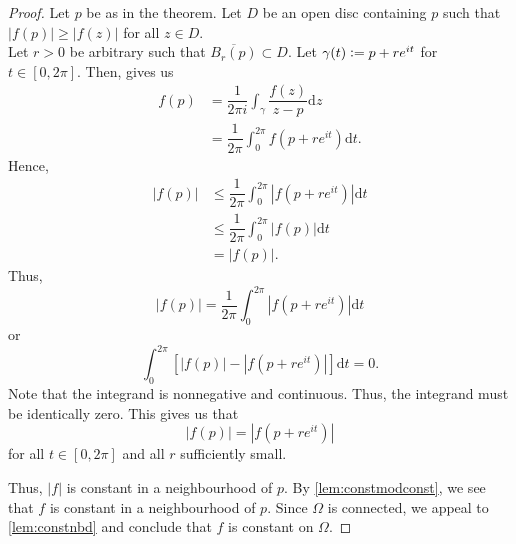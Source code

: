 \maxmod*\label{thm:maxmod2}
\begin{flushright}\hyperref[thm:maxmod]{\upsym}\end{flushright}
\begin{proof}
	Let $p$ be as in the theorem. Let $D$ be an open disc containing $p$ such that $\left|f(p)\right| \ge \left|f(z)\right|$ for all $z \in D.$\\
	Let $r > 0$ be arbitrary such that $\overline{B_r(p)} \subset D.$ Let $\gamma(t) \vcentcolon= p + re^{it}$ for $t \in [0, 2\pi].$ Then,  gives us
	\begin{align*} 
		f(p) &= \dfrac{1}{2\pi i}\int_{\gamma}^{} \dfrac{f(z)}{z - p} \mathrm{d}z\\
		&= \dfrac{1}{2\pi}\int_{0}^{2\pi} f(p + re^{it}) \mathrm{d}t.
	\end{align*}
	Hence,
	\begin{align*} 
		\left|f(p)\right| &\le \dfrac{1}{2\pi}\int_{0}^{2\pi} \left|{f(p + re^{it})}\right| \mathrm{d}t\\
		&\le \dfrac{1}{2\pi}\int_{0}^{2\pi} \left|{f(p)}\right| \mathrm{d}t\\
		&= \left|f(p)\right|.
	\end{align*}
	Thus,
	\begin{equation*} 
		\left|f(p)\right| = \dfrac{1}{2\pi}\int_{0}^{2\pi} \left|{f(p + re^{it})}\right| \mathrm{d}t
	\end{equation*}
	or
	\begin{equation*} 
		\int_{0}^{2\pi} \left[\left|f(p)\right| - \left|{f(p + re^{it})}\right|\right] \mathrm{d}t = 0.
	\end{equation*}
	Note that the integrand is nonnegative and continuous. Thus, the integrand must be identically zero. This gives us that
	\begin{equation*} 
		\left|f(p)\right| = \left|f(p + re^{it})\right|
	\end{equation*}
	for all $t \in [0, 2\pi]$ and all $r$ sufficiently small.

	Thus, $|f|$ is constant in a neighbourhood of $p.$ By \cref{lem:constmodconst}, we see that $f$ is constant in a neighbourhood of $p.$ Since $\Omega$ is connected, we appeal to \cref{lem:constnbd} and conclude that $f$ is constant on $\Omega.$
\end{proof}


